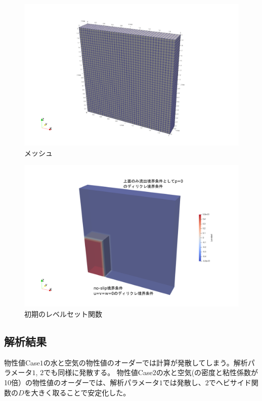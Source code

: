 \documentclass[8pt,a4paper]{article}
\begin{document}
\begin{figure}[htbp]
	\centering
	\includegraphics[width=18truecm]{pics/3d-dambreak/mesh.pdf}
	\caption{メッシュ}
	\label{fig:3d-dambreak-mesh}
\end{figure}

\begin{figure}[htbp]
	\centering
	\includegraphics[width=18truecm]{pics/3d-dambreak/levelset_init.pdf}
	\caption{初期のレベルセット関数}
	\label{fig:3d-dambreak-mesh}
\end{figure}

\subsection{解析結果}

物性値Case$1$の水と空気の物性値のオーダーでは計算が発散してしまう。解析パラメータ$1$, $2$でも同様に発散する。
物性値Case$2$の水と空気(の密度と粘性係数が10倍）の物性値のオーダーでは、解析パラメータ$1$では発散し、$2$でヘビサイド関数の$D$を大きく取ることで安定化した。
\end{document}
